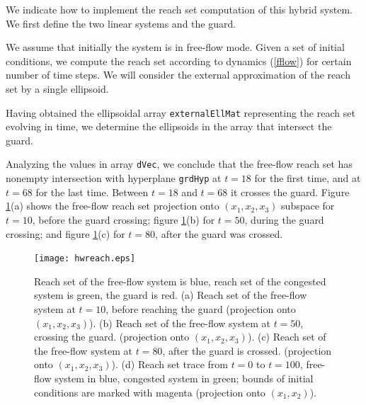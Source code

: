 We indicate how to implement the reach set computation of this hybrid system.
We first define the two linear systems and the guard.

We assume that initially the system is in free-flow mode.
Given a set of initial conditions, we  compute the reach set according
to dynamics (\ref{fflow}) for certain number of time steps.
We will consider the external approximation of the reach set by a single
ellipsoid.

Having obtained the ellipsoidal array {\tt externalEllMat} representing the reach set
evolving in time, we  determine the  ellipsoids in the array that
intersect the guard.

Analyzing the values in array {\tt dVec}, we conclude that the free-flow reach set
has nonempty intersection with hyperplane {\tt grdHyp} at $t=18$
for the first time, and at $t=68$ for the last time.
Between $t=18$ and
$t=68$ it crosses the guard. Figure \ref{hwreachfig}(a) shows the
free-flow reach set projection onto $(x_1,x_2,x_3)$ subspace for $t=10$,
before the guard crossing; figure \ref{hwreachfig}(b) for $t=50$,
during the guard crossing; and figure \ref{hwreachfig}(c) for $t=80$,
after the guard was crossed.
\begin{figure}[htbp]
\centerline{
\texttt{[image: hwreach.eps]}}
\caption{Reach set of the free-flow system is blue, reach set of the congested
system is green, the guard is red.
\newline
(a) Reach set of the free-flow system at $t = 10$, before reaching the guard
(projection onto $(x_1,x_2,x_3)$).
\newline
(b) Reach set of the free-flow system at $t = 50$, crossing the guard.
(projection onto $(x_1,x_2,x_3)$).
\newline
(c) Reach set of the free-flow system at $t = 80$, after the guard is crossed.
(projection onto $(x_1,x_2,x_3)$).
\newline
(d) Reach set trace from $t=0$ to $t=100$, free-flow system in blue,
congested system in green; bounds of initial conditions are marked with magenta
(projection onto $(x_1,x_2)$).  }
\label{hwreachfig}
\end{figure}

